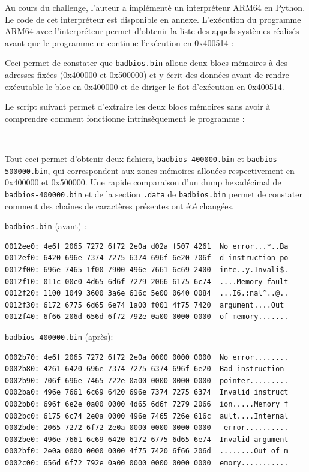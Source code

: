 \documentclass[a4paper,10pt]{article}
\newcommand{\pyinput}[1]{%
    \noindent{\color[rgb]{0.5, 0.5, 0.5}{\rule{\textwidth}{0.4pt}}}
     \\
    \noindent{\color[rgb]{0.5, 0.5, 0.5}{\rule{\textwidth}{0.4pt}}}
}
\begin{document}
Au cours du challenge, l'auteur a implémenté un interpréteur ARM64 en Python. Le code de cet interpréteur est disponible en annexe. L'exécution du programme ARM64 avec l'interpréteur permet d'obtenir la liste des appels systèmes réalisés avant que le programme ne continue l'exécution en 0x400514 :



Ceci permet de constater que \texttt{badbios.bin} alloue deux blocs mémoires à des adresses fixées (0x400000 et 0x500000) et y écrit des données avant de rendre exécutable le bloc en 0x400000 et de diriger le flot d'exécution en 0x400514.

Le script suivant permet d'extraire les deux blocs mémoires sans avoir à comprendre comment fonctionne intrinsèquement le programme :

\pyinput{2_arm64/unpack_badbios.py.inc.tex}

Tout ceci permet d'obtenir deux fichiers, \texttt{badbios-400000.bin} et \texttt{badbios-500000.bin}, qui correspondent aux zones mémoires allouées respectivement en 0x400000 et 0x500000. Une rapide comparaison d'un dump hexadécimal de \texttt{badbios-400000.bin} et de la section \texttt{.data} de \texttt{badbios.bin} permet de constater comment des chaînes de caractères présentes ont été changées.

\texttt{badbios.bin} (avant) :
\begin{verbatim}
0012ee0: 4e6f 2065 7272 6f72 2e0a d02a f507 4261  No error...*..Ba
0012ef0: 6420 696e 7374 7275 6374 696f 6e20 706f  d instruction po
0012f00: 696e 7465 1f00 7900 496e 7661 6c69 2400  inte..y.Invali$.
0012f10: 011c 00c0 4d65 6d6f 7279 2066 6175 6c74  ....Memory fault
0012f20: 1100 1049 3600 3a6e 616c 5e00 0640 0084  ...I6.:nal^..@..
0012f30: 6172 6775 6d65 6e74 1a00 f001 4f75 7420  argument....Out
0012f40: 6f66 206d 656d 6f72 792e 0a00 0000 0000  of memory.......
\end{verbatim}

\texttt{badbios-400000.bin} (après):
\begin{verbatim}
0002b70: 4e6f 2065 7272 6f72 2e0a 0000 0000 0000  No error........
0002b80: 4261 6420 696e 7374 7275 6374 696f 6e20  Bad instruction
0002b90: 706f 696e 7465 722e 0a00 0000 0000 0000  pointer.........
0002ba0: 496e 7661 6c69 6420 696e 7374 7275 6374  Invalid instruct
0002bb0: 696f 6e2e 0a00 0000 4d65 6d6f 7279 2066  ion.....Memory f
0002bc0: 6175 6c74 2e0a 0000 496e 7465 726e 616c  ault....Internal
0002bd0: 2065 7272 6f72 2e0a 0000 0000 0000 0000   error..........
0002be0: 496e 7661 6c69 6420 6172 6775 6d65 6e74  Invalid argument
0002bf0: 2e0a 0000 0000 0000 4f75 7420 6f66 206d  ........Out of m
0002c00: 656d 6f72 792e 0a00 0000 0000 0000 0000  emory...........
\end{verbatim}
\end{document}
